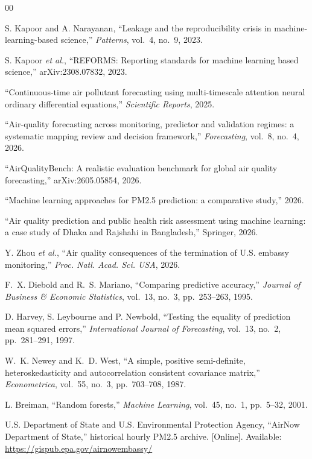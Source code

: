 \documentclass[conference,a4paper]{IEEEtran}
\begin{document}
\begin{thebibliography}{00}


 S. Kapoor and A. Narayanan, ``Leakage and the reproducibility
crisis in machine-learning-based science,'' \emph{Patterns}, vol.~4, no.~9,
2023.

 S. Kapoor \emph{et al.}, ``REFORMS: Reporting standards for
machine learning based science,'' arXiv:2308.07832, 2023. %

 ``Continuous-time air pollutant forecasting using multi-timescale
attention neural ordinary differential equations,'' \emph{Scientific Reports},
2025. %

 ``Air-quality forecasting across monitoring, predictor
and validation regimes: a systematic mapping review and decision framework,''
\emph{Forecasting}, vol.~8, no.~4, 2026. %

 ``AirQualityBench: A realistic evaluation benchmark for global
air quality forecasting,'' arXiv:2605.05854, 2026. %

 ``Machine learning approaches for PM2.5 prediction: a
comparative study,'' 2026. %

 ``Air quality prediction and public health risk assessment
using machine learning: a case study of Dhaka and Rajshahi in Bangladesh,''
Springer, 2026. %

 Y. Zhou \emph{et al.}, ``Air quality consequences of the
termination of U.S. embassy monitoring,'' \emph{Proc. Natl. Acad. Sci. USA},
2026. %

 F.~X. Diebold and R.~S. Mariano, ``Comparing predictive accuracy,''
\emph{Journal of Business \& Economic Statistics}, vol.~13, no.~3, pp.~253--263,
1995.

 D. Harvey, S. Leybourne and P. Newbold, ``Testing the equality of
prediction mean squared errors,'' \emph{International Journal of Forecasting},
vol.~13, no.~2, pp.~281--291, 1997.

 W.~K. Newey and K.~D. West, ``A simple, positive semi-definite,
heteroskedasticity and autocorrelation consistent covariance matrix,''
\emph{Econometrica}, vol.~55, no.~3, pp.~703--708, 1987.

 L. Breiman, ``Random forests,'' \emph{Machine Learning},
vol.~45, no.~1, pp.~5--32, 2001.

 U.S. Department of State and U.S. Environmental Protection
Agency, ``AirNow Department of State,'' historical hourly PM2.5 archive.
[Online]. Available: \url{https://gispub.epa.gov/airnowembassy/}

\end{thebibliography}
\end{document}
